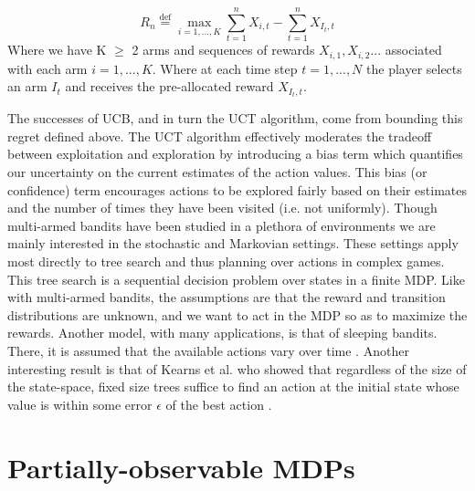 \documentclass[msc, ai, twoside, notimes, logo, parskip, leftchapter, normalheadings]{infthesis}
\newcommand*{\defeq}{\stackrel{\text{def}}{=}}
\begin{document}
\begin{equation}
R_n \defeq \max_{i=1,...,K} \sum_{t=1}^n X_{i,t} - \sum_{t=1}^n X_{I_t,t}
\end{equation}
Where we have K \(\geq\) 2 arms and sequences of rewards \(X_{i,1},X_{i,2}...\) associated with each arm \( i = 1,...,K\). Where at each time step \( t=1,...,N\) the player selects an arm \(I_t\) and receives the pre-allocated reward \(X_{I_t,t}\).

The successes of UCB, and in turn the UCT algorithm, come from bounding this regret defined above. The UCT algorithm effectively moderates the tradeoff between exploitation and exploration by introducing a bias term which quantifies our uncertainty on the current estimates of the action values. This bias (or confidence) term encourages actions to be explored fairly based on their estimates and the number of times they have been visited (i.e. not uniformly).
Though multi-armed bandits have been studied in a plethora of environments we are mainly interested in the stochastic and Markovian settings. These settings apply most directly to tree search and thus planning over actions in complex games. This tree search is a sequential decision problem over states in a finite MDP. Like with multi-armed bandits, the assumptions are that the reward and transition distributions are unknown, and we want to act in the MDP so as to maximize the rewards. Another model, with many applications, is that of sleeping bandits. There, it is assumed that the available actions vary over time \citep{regretAnalysis}. Another interesting result is that of Kearns et al. who showed that regardless of the size of the state-space, fixed size trees suffice to find an action at the initial state whose value is within some error \(\epsilon\) of the best action \citep{Kearns2002}.

\section{Partially-observable MDPs}
\end{document}

